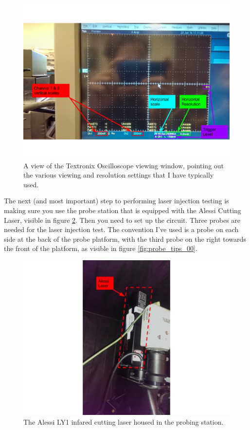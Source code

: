 \documentclass{report}
\begin{document}
            \begin{figure}[h] 
                \includegraphics[height=.4\textheight]{oscilloscope_00}
                \centering
                \caption{ A view of the Textronix Oscilloscope viewing window, pointing out the various viewing and resolution settings that I have typically used. }
                \label{fig:oscilloscope_00}
            \end{figure}


            The next (and most important) step to performing laser injection testing is making sure you use the probe station that is equipped with the Alessi Cutting Laser, visible in figure \ref{fig:laser_02}. Then you need to set up the circuit. Three probes are needed for the laser injection test. The convention I've used is a probe on each side at the back of the probe platform, with the third probe on the right towards the front of the platform, as visible in figure \ref{fig:probe_tips_00}.

            \begin{figure}[h] 
                \includegraphics[height=.4\textheight]{laser_02}
                \centering
                \caption{ The Alessi LY1 infared cutting laser housed in the probing station. }
                \label{fig:laser_02}
            \end{figure}
\end{document}
